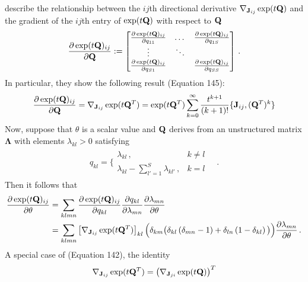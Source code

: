 \documentclass[12pt]{article} %
\begin{document}
\newcommand{\Llambda}{\boldsymbol{\Lambda}}

\noindent
\citet{najfeld1995derivatives} describe the relationship between the $ij$th directional derivative $\nabla_{\mathbf{J}_{ij}} \exp(t\mathbf{Q})$ and the gradient of the $ij$th entry of $\exp(t\mathbf{Q})$ with respect to $\mathbf{Q}$
\begin{align*}
	\frac{\partial \exp(t\mathbf{Q})_{ij}}{\partial \mathbf{Q}} := \begin{bmatrix}
	 \frac{\partial \exp(t\mathbf{Q})_{ij} }{\partial q_{11}} & \dots &  \frac{\partial \exp(t\mathbf{Q})_{ij} }{\partial q_{1S}} \\
	 \vdots & \ddots & \\
	  \frac{\partial \exp(t\mathbf{Q})_{ij} }{\partial q_{S1}} & &  \frac{\partial \exp(t\mathbf{Q})_{ij} }{\partial q_{SS}} 
	\end{bmatrix} \, .
\end{align*}
In particular, they show the following result (Equation 145):
\begin{align*}
\frac{	\partial \exp(t\mathbf{Q})_{ij}}{\partial \mathbf{Q}} = \nabla_{\mathbf{J}_{ij}} \exp(t\mathbf{Q}^T) =\exp(t\mathbf{Q}^T)  \sum_{k=0}^\infty \frac{t^{k+1}}{(k+1)!} \{\mathbf{J}_{ij},(\mathbf{Q}^T)^k\}
\end{align*}
Now, suppose that $\theta$ is a scalar value and $\mathbf{Q}$ derives from an unstructured matrix $\Llambda$ with elements $\lambda_{kl}>0$ satisfying
\begin{align*}
	q_{kl} = \bigg\{ \begin{matrix}
		\lambda_{kl} \,,& k \neq l \\
	\lambda_{kl}	-\sum_{l'=1}^S\lambda_{kl'} \, , &  k= l 
	\end{matrix} \quad .
\end{align*}
Then it follows that
\begin{align}\label{eq:together}
	\frac{\partial \exp(t\mathbf{Q})_{ij}}{\partial \theta} &= \sum_{klmn} \frac{\partial \exp(t\mathbf{Q})_{ij}}{\partial q_{kl}} \frac{\partial q_{kl}}{\partial \lambda_{mn} } \frac{\partial \lambda_{mn}}{\partial \theta} \\  \nonumber
	&= \sum_{klmn}  \left[ \nabla_{\mathbf{J}_{ij}} \exp(t\mathbf{Q}^T) \right]_{kl} \Big(\delta_{km} \big( \delta_{kl} \left(\delta_{mn}-1\right) + \delta_{ln}\left(1-\delta_{kl}\right) \big) \Big) \frac{\partial \lambda_{mn}}{\partial \theta}  \, .
\end{align}
A special case of \citet{najfeld1995derivatives} (Equation 142), the identity
\begin{align*}
\nabla_{\mathbf{J}_{ij}} \exp(t\mathbf{Q}^T) = \left( \nabla_{\mathbf{J}_{ji}} \exp(t\mathbf{Q}) \right)^T 
\end{align*}
\end{document}

